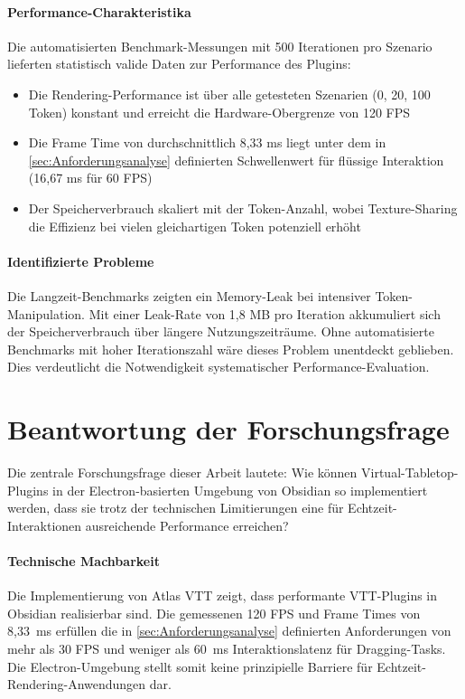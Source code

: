 \paragraph{Performance-Charakteristika}
Die automatisierten Benchmark-Messungen mit 500 Iterationen pro Szenario lieferten statistisch valide Daten zur Performance des Plugins:

\begin{itemize}
	\item Die Rendering-Performance ist über alle getesteten Szenarien (0, 20, 100 Token) konstant und erreicht die Hardware-Obergrenze von 120 \ac{FPS}
	\item Die Frame Time von durchschnittlich 8,33 \ac{ms} liegt unter dem in \autoref{sec:Anforderungsanalyse} definierten Schwellenwert für flüssige Interaktion (16,67 \ac{ms} für 60 \ac{FPS})
	\item Der Speicherverbrauch skaliert mit der Token-Anzahl, wobei Texture-Sharing die Effizienz bei vielen gleichartigen Token potenziell erhöht
\end{itemize}

\paragraph{Identifizierte Probleme}
Die Langzeit-Benchmarks zeigten ein Memory-Leak bei intensiver Token-Manipulation. Mit einer Leak-Rate von 1,8 \ac{MB} pro Iteration akkumuliert sich der Speicherverbrauch über längere Nutzungszeiträume. Ohne automatisierte Benchmarks mit hoher Iterationszahl wäre dieses Problem unentdeckt geblieben. Dies verdeutlicht die Notwendigkeit systematischer Performance-Evaluation.

\section{Beantwortung der Forschungsfrage}
\label{sec:BeantwortungForschungsfrage}

Die zentrale Forschungsfrage dieser Arbeit lautete: Wie können Virtual-Tabletop-Plugins in der Electron-basierten Umgebung von Obsidian so implementiert werden, dass sie trotz der technischen Limitierungen eine für Echtzeit-Interaktionen ausreichende Performance erreichen?

\paragraph{Technische Machbarkeit}

Die Implementierung von Atlas \ac{VTT} zeigt, dass performante \ac{VTT}-Plugins in Obsidian realisierbar sind. Die gemessenen 120 \ac{FPS} und Frame Times von 8,33~\ac{ms} erfüllen die in \autoref{sec:Anforderungsanalyse} definierten Anforderungen von mehr als 30 \ac{FPS} und weniger als 60~\ac{ms} Interaktionslatenz für Dragging-Tasks. Die Electron-Umgebung stellt somit keine prinzipielle Barriere für Echtzeit-Rendering-Anwendungen dar.

